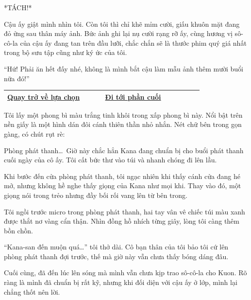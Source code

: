 \documentclass[../main.tex]{subfiles}
\begin{document}
*TÁCH!*

Cậu ấy giật mình nhìn tôi. Còn tôi thì chỉ khẽ mỉm cười, giấu khuôn mặt đang đỏ ửng sau thân máy ảnh. Bức ảnh ghi lại nụ cười rạng rỡ ấy, cùng hương vị sô-cô-la của cậu ấy đang tan trên đầu lưỡi, chắc chắn sẽ là thước phim quý giá nhất trong bộ sưu tập cũng như ký ức của tôi.

``Hứ! Phải ăn hết đấy nhé, không là mình bắt cậu làm mẫu ảnh thêm mười buổi nữa đó!''

\begin{table}[H]
  \centering
  \setlength{\arrayrulewidth}{1pt}
  \begin{tabular}{|>{\centering\arraybackslash}p{0.4\linewidth}|>{\centering\arraybackslash}p{0.4\linewidth}|}
    \hline
    \hyperref[choice]{Quay trở về lựa chọn} & \hyperref[ending]{Đi tới phần cuối} \\ \hline
  \end{tabular}
\end{table}

\newpage
\label{kanade}

Tôi lấy một phong bì màu trắng tinh khôi trong xấp phong bì này. Nổi bật trên nền giấy là một hình dán đôi cánh thiên thần nhỏ nhắn. Nét chữ bên trong gọn gàng, có chút rụt rè:


Phòng phát thanh\dots\ Giờ này chắc hẳn Kana đang chuẩn bị cho buổi phát thanh cuối ngày của cô ấy. Tôi cất bức thư vào túi và nhanh chóng đi lên lầu.

Khi bước đến cửa phòng phát thanh, tôi ngạc nhiên khi thấy cánh cửa đang hé mở, nhưng không hề nghe thấy giọng của Kana như mọi khi. Thay vào đó, một giọng nói trong trẻo nhưng đầy bối rối vang lên từ bên trong.

\ct


Tôi ngồi trước micro trong phòng phát thanh, hai tay vân vê chiếc túi màu xanh được thắt nơ vàng cẩn thận. Nhìn đồng hồ nhích từng giây, lòng tôi càng thêm bồn chồn.

``Kana-san đến muộn quá\dots'' tôi thở dài. Cô bạn thân của tôi bảo tôi cứ lên phòng phát thanh đợi trước, thế mà giờ này vẫn chưa thấy bóng dáng đâu.

Cuối cùng, đã đến lúc lên sóng mà mình vẫn chưa kịp trao sô-cô-la cho Kuon. Rõ ràng là mình đã chuẩn bị rất kỹ, nhưng khi đối diện với cậu ấy ở lớp, mình lại chẳng thốt nên lời.
\end{document}
